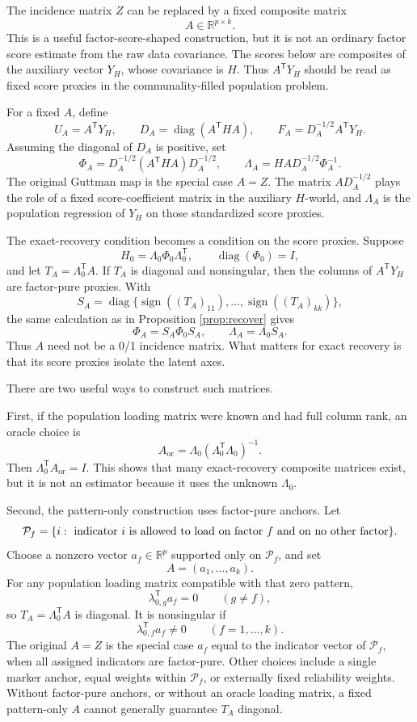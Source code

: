\documentclass[11pt]{article}
\newcommand{\T}{^{\mathsf T}}
\newcommand{\diag}{\operatorname{diag}}
\theoremstyle{plain}
\theoremstyle{remark}
\begin{document}
The incidence matrix \(Z\) can be replaced by a fixed composite matrix
\[
  A\in\mathbb R^{p\times k}.
\]
This is a useful factor-score-shaped construction, but it is not an ordinary
factor score estimate from the raw data covariance. The scores below are
composites of the auxiliary vector \(Y_H\), whose covariance is \(H\). Thus
\(A\T Y_H\) should be read as fixed score proxies in the communality-filled
population problem.

For a fixed \(A\), define
\[
  U_A=A\T Y_H,
  \qquad
  D_A=\diag(A\T H A),
  \qquad
  F_A=D_A^{-1/2}A\T Y_H .
\]
Assuming the diagonal of \(D_A\) is positive, set
\begin{equation}\label{eq:general-composite-map}
  \Phi_A=D_A^{-1/2}(A\T H A)D_A^{-1/2},
  \qquad
  \Lambda_A=HAD_A^{-1/2}\Phi_A^{-1}.
\end{equation}
The original Guttman map is the special case \(A=Z\). The matrix
\(AD_A^{-1/2}\) plays the role of a fixed score-coefficient matrix in the
auxiliary \(H\)-world, and \(\Lambda_A\) is the population regression of
\(Y_H\) on those standardized score proxies.

The exact-recovery condition becomes a condition on the score proxies. Suppose
\[
  H_0=\Lambda_0\Phi_0\Lambda_0\T,
  \qquad
  \diag(\Phi_0)=I,
\]
and let \(T_A=\Lambda_0\T A\). If \(T_A\) is diagonal and nonsingular, then
the columns of \(A\T Y_H\) are factor-pure proxies. With
\[
  S_A=\diag\{\operatorname{sign}((T_A)_{11}),\ldots,
              \operatorname{sign}((T_A)_{kk})\},
\]
the same calculation as in Proposition \ref{prop:recover} gives
\[
  \Phi_A=S_A\Phi_0S_A,
  \qquad
  \Lambda_A=\Lambda_0S_A .
\]
Thus \(A\) need not be a 0/1 incidence matrix. What matters for exact recovery
is that its score proxies isolate the latent axes.

There are two useful ways to construct such matrices.

First, if the population loading matrix were known and had full column rank, an
oracle choice is
\[
  A_{\mathrm{or}}
  =
  \Lambda_0(\Lambda_0\T\Lambda_0)^{-1}.
\]
Then \(\Lambda_0\T A_{\mathrm{or}}=I\). This shows that many exact-recovery
composite matrices exist, but it is not an estimator because it uses the
unknown \(\Lambda_0\).

Second, the pattern-only construction uses factor-pure anchors. Let
\[
  \mathcal P_f
  =
  \{i:\hbox{ indicator } i \hbox{ is allowed to load on factor } f
      \hbox{ and on no other factor}\}.
\]
Choose a nonzero vector \(a_f\in\mathbb R^p\) supported only on
\(\mathcal P_f\), and set
\[
  A=(a_1,\ldots,a_k).
\]
For any population loading matrix compatible with that zero pattern,
\[
  \lambda_{0,g}\T a_f=0\qquad(g\ne f),
\]
so \(T_A=\Lambda_0\T A\) is diagonal. It is nonsingular if
\[
  \lambda_{0,f}\T a_f\ne 0
  \qquad(f=1,\ldots,k).
\]
The original \(A=Z\) is the special case \(a_f\) equal to the indicator vector
of \(\mathcal P_f\), when all assigned indicators are factor-pure. Other
choices include a single marker anchor, equal weights within \(\mathcal P_f\),
or externally fixed reliability weights. Without factor-pure anchors, or
without an oracle loading matrix, a fixed pattern-only \(A\) cannot generally
guarantee \(T_A\) diagonal.
\end{document}
